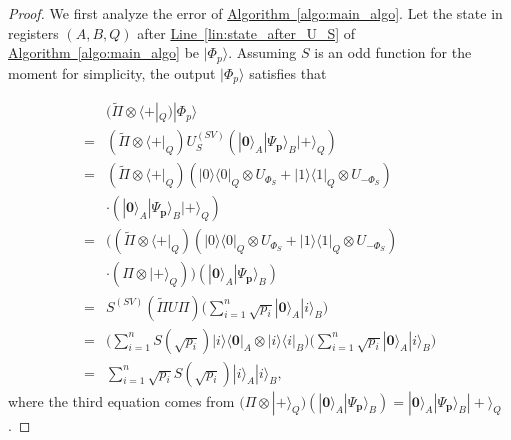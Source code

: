 \documentclass[journal]{IEEEtran}
\newcommand{\thm}[1]{\hyperref[thm:#1]{Theorem~\ref*{thm:#1}}}
\newcommand{\algo}[1]{\hyperref[algo:#1]{Algorithm~\ref*{algo:#1}}}
\newcommand{\lin}[1]{\hyperref[lin:#1]{Line~\ref*{lin:#1}}}
\renewcommand{\bra}[1]{\langle#1|}
\renewcommand{\ket}[1]{|#1\rangle}
\newcommand{\xzw}[1]{{\color{blue}{Xinzhao: \textbf{#1}}}}
\begin{document}
\begin{proof}
    We first analyze the error of \algo{main_algo}.
    Let the state in registers $(A,B,Q)$ after \lin{state_after_U_S} of \algo{main_algo} be $|\Phi_p\rangle$. Assuming $S$ is an odd function for the moment for simplicity, the output $|\Phi_{p}\rangle$ satisfies that

  \begin{align}
    \label{eq:cal_qsvt}
    &(\widetilde{\Pi } \otimes \langle+|_Q)|\Phi_{p}\rangle\nonumber\\
    =& (\widetilde{\Pi } \otimes \langle+|_Q)U^{(SV)}_S(|\mathbf{0}\rangle_A|\Psi_{\mathbf{p}}\rangle_B|+\rangle_Q)\nonumber\\
    =& (\widetilde{\Pi } \otimes \langle+|_Q)(|0\rangle\langle 0|_Q\otimes U_{\Phi_S}+| 1\rangle\langle 1|_Q \otimes U_{-\Phi_S})\nonumber \\ &\cdot(|\mathbf{0}\rangle_A|\Psi_{\mathbf{p}}\rangle_B |+\rangle_Q)\nonumber\\
    =& \bigl((\widetilde{\Pi } \otimes \langle+|_Q)(|0\rangle\langle 0|_Q\otimes U_{\Phi_S}+| 1\rangle\langle 1|_Q \otimes U_{-\Phi_S})\nonumber \\ &\cdot(\Pi\otimes |+\rangle_Q)\bigr)(|\mathbf{0}\rangle_A|\Psi_{\mathbf{p}}\rangle_B )\nonumber\\
     =& S^{(SV)}(\tilde \Pi U \Pi)\Big(\sum_{i=1}^{n} \sqrt{p_{i}}|\mathbf{0}\rangle_A|i\rangle_B\Big) \nonumber\\
     =& \Big(\sum_{i=1}^{n}S(\sqrt{p_i}) |i\rangle \langle \mathbf{0}|_A\otimes |i\rangle \langle i|_B\Big)\Big(\sum_{i=1}^{n} \sqrt{p_{i}}|\mathbf{0}\rangle_A|i\rangle_B\Big)\nonumber \\
     =& \sum_{i=1}^{n} \sqrt{p_{i}} S\left(\sqrt{p_{i}}\right)|i\rangle_A|i\rangle_B,
  \end{align}
where the third equation comes from $(\Pi\otimes | + \rangle_Q)(|\mathbf{0}\rangle_A|\Psi_{\mathbf{p}}\rangle_B ) = |\mathbf{0}\rangle_A|\Psi_{\mathbf{p}}\rangle_B |+\rangle_Q$. %


\end{proof}
\end{document}
